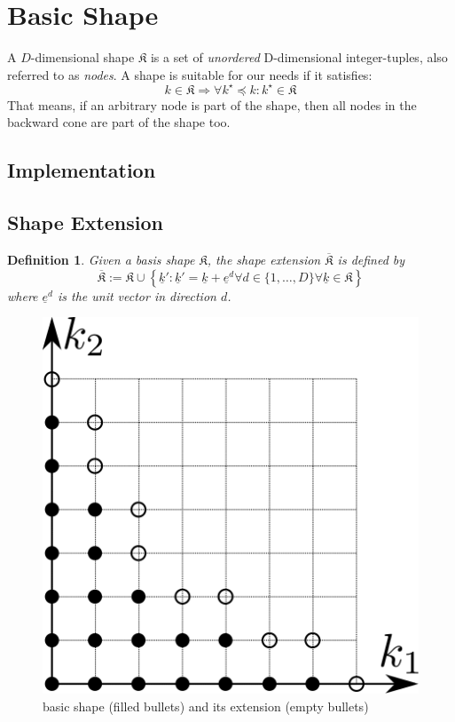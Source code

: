 \documentclass{article}
\newtheorem{definition}{Definition}
\begin{document}
\section{Basic Shape}

A \(D\)-dimensional shape \(\mathfrak{K}\) is a set of \emph{unordered} D-dimensional integer-tuples, also referred to as \emph{nodes}.
A shape is suitable for our needs if it satisfies:
\[k \in \mathfrak{K} \Rightarrow \forall k^\star \preceq k \colon k^\star \in \mathfrak{K}\]
That means, if an arbitrary node is part of the shape, then all nodes in the backward cone are part of the shape too.

\subsection{Implementation}

\subsection{Shape Extension}

\begin{definition}
Given a basis shape \( \mathfrak{K} \), the shape extension
\( \overline{\mathfrak{K}} \) is defined by
\begin{equation}
\overline{\mathfrak{K}} := \mathfrak{K} \cup 
\left\{\underline{k}' \colon \underline{k}' = \underline{k} + \underline{e}^d 
\forall d \in \{1,\ldots,D\} \forall \underline{k} \in \mathfrak{K}\right\}
\end{equation}
where \( \underline{e}^d \) is the unit vector in direction \( d \).
\end{definition}

\begin{figure}[H]
  \begin{center}
    \includegraphics[width=0.5\linewidth]{shape_extension}
  \end{center}
  \caption{basic shape (filled bullets) and its extension (empty bullets)}
\end{figure}
\end{document}
